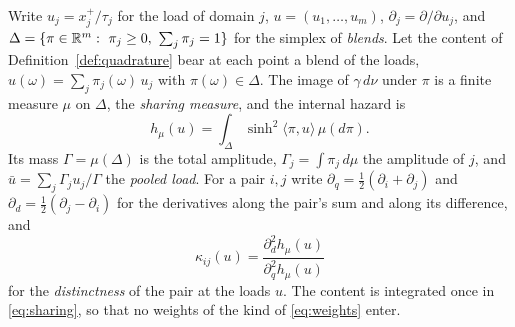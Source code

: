 \begin{definition}\label{def:sharing}
Write $u_j=x_j^+/\tau_j$ for the load of domain $j$, $u=(u_1,\dots,u_m)$,
$\partial_j=\partial/\partial u_j$, and
$\Delta=\{\pi\in\R^m:\ \pi_j\ge0,\ \sum_j\pi_j=1\}$ for the simplex of
\emph{blends}. Let the content of Definition~\ref{def:quadrature} bear at
each point a blend of the loads, $u(\omega)=\sum_j\pi_j(\omega)\,u_j$ with
$\pi(\omega)\in\Delta$. The image of $\gamma\,d\nu$ under $\pi$ is a
finite measure $\mu$ on $\Delta$, the \emph{sharing measure}, and the
internal hazard is
\begin{equation}\label{eq:sharing}
h_\mu(u)=\int_\Delta\sinh^2\langle\pi,u\rangle\,\mu(d\pi).
\end{equation}
Its mass $\Gamma=\mu(\Delta)$ is the total amplitude,
$\Gamma_j=\int\pi_j\,d\mu$ the amplitude of $j$, and
$\bar u=\sum_j\Gamma_ju_j/\Gamma$ the \emph{pooled load}. For a pair $i,j$
write $\partial_q=\tfrac12(\partial_i+\partial_j)$ and
$\partial_d=\tfrac12(\partial_j-\partial_i)$ for the derivatives along the
pair's sum and along its difference, and
\begin{equation}\label{eq:distinct}
\kappa_{ij}(u)=\frac{\partial_d^2h_\mu(u)}{\partial_q^2h_\mu(u)}
\end{equation}
for the \emph{distinctness} of the pair at the loads $u$. The content is
integrated once in \eqref{eq:sharing}, so that no weights of the kind of
\eqref{eq:weights} enter.
\end{definition}

